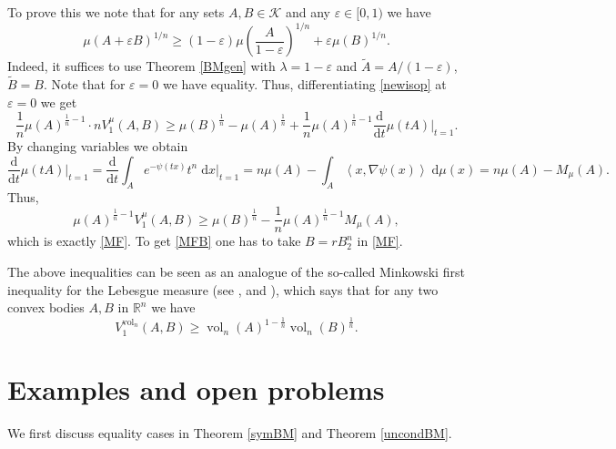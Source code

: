 \documentclass[11pt]{article}
\newcommand{\call}[4]{\int_{#1}^{#2} {#3} \; \textrm{d} {#4}}
\newcommand{\mb}[1]{\mathbb{{#1}}}
\newcommand{\mc}[1]{\mathcal{{#1}}}
\newcommand{\1}{\mathbf{{1}}}
\newcommand{\e}{\varepsilon}
\newcommand{\po}[2]{\frac{\textrm{d} #1}{\textrm{d} #2}}
\newcommand{\scal}[2]{\left\langle #1, #2 \right\rangle}
\DeclareMathOperator{\vol}{vol}
\theoremstyle{definition}
\begin{document}
\noindent To prove this we note that for any sets $A,B \in \mc{K}$ and any $\e \in [0,1)$ we have
\begin{equation}\label{newisop}
	\mu(A+\e B)^{1/n} \geq (1-\e) \mu\left( \frac{A}{1-\e} \right)^{1/n} + \e \mu(B)^{1/n}.
\end{equation}
Indeed, it suffices to use Theorem \ref{BMgen} with $\lambda = 1-\e$ and $\tilde{A}=A/(1-\e)$, $\tilde{B}=B$. Note that for $\e=0$ we have equality. Thus, differentiating \eqref{newisop} at $\e=0$ we get
\[
	\frac{1}{n} \mu(A)^{\frac{1}{n}-1} \cdot n V_1^\mu(A,B) \geq \mu(B)^{\frac{1}{n}} -\mu(A)^{\frac{1}{n}} + \frac{1}{n}   \mu(A)^{\frac{1}{n}-1} \po{}{t} \mu(tA)\Big|_{t=1}.
\]
By changing variables we obtain
\begin{equation}\label{infs}
	\po{}{t} \mu(tA)\Big|_{t=1} = \po{}{t}  \call{A}{}{e^{-\psi(tx)}t^n}{}{x} \Big|_{t=1} = n \mu(A) - \call{A}{}{\scal{x}{\nabla \psi(x)}}{\mu(x)} = n \mu(A)-M_\mu(A).
\end{equation}
Thus,
\[
	\mu(A)^{\frac{1}{n}-1}  V_1^\mu(A,B) \geq \mu(B)^{\frac{1}{n}}  - \frac{1}{n}   \mu(A)^{\frac{1}{n}-1}M_\mu(A),
\]
which is exactly \eqref{MF}. To get \eqref{MFB} one has to take $B=rB_2^n$ in \eqref{MF}.

The above inequalities can be seen as an analogue of the so-called Minkowski first inequality for the Lebesgue measure (see \cite{G1}, \cite{G2} and \cite{Sn}), which says that for any two convex bodies $A,B$ in $\mb{R}^n$ we have
\[
	V_1^{\vol_n}(A,B) \geq \vol_n(A)^{1-\frac{1}{n}} \vol_n(B)^{\frac{1}{n}}.
\]



\section{Examples and open problems}\label{3}

We first discuss equality cases in Theorem \ref{symBM} and Theorem \ref{uncondBM}.
\end{document}

